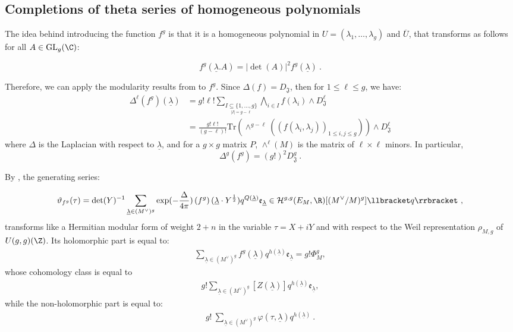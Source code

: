 \documentclass[11pt,letterpaper,english]{amsart}
\numberwithin{equation}{subsection}
\numberwithin{equation}{section}
\newcommand\cH{{\mathcal H}}
\newcommand\fJ{{\mathfrak J}}
\newcommand{\trace}{\mathrm{Tr}}
\theoremstyle{plain}
\theoremstyle{remark}
\begin{document}
\subsection{Completions of theta series of homogeneous polynomials}


The idea behind introducing the function $f^g$ is that it is a homogeneous polynomial in $U=(\lambda_1,\ldots,\lambda_g)$ and $\overline U$, that transforms as follows for all $A\in\mathrm{GL}_g(\C)$: 

\[f^g(\underline \lambda .A)=|\det(A)|^2f^g(\underline \lambda) ~.\] 

Therefore, we can apply the modularity results from  to $f^g$. Since $\Delta(f)=D_\fJ$, then for $1\leq \ell\leq g$, we have: 
\begin{align*}
    \Delta^\ell(f^g)(\underline{\lambda})&=g!\ell!\sum_{\underset{|I|=g-\ell}{I\subseteq\{1,\ldots,g\}} }\bigwedge_{i\in I}f(\lambda_i)\wedge D_{\fJ}^\ell\\
    &=\frac{g!\ell!}{(g-\ell)!}\trace\left(\wedge^{g-\ell}((f(\lambda_i,\lambda_j))_{1\leq i,j\leq g})\right)\wedge D_{\fJ}^\ell
\end{align*}
where $\Delta$ is the Laplacian with respect to $\underline{\lambda}$, and for a $g\times g$ matrix $P$, $\wedge^{\ell}(M)$ is the matrix of $\ell\times \ell$ minors. In particular, \[\Delta^g(f^g)=(g!)^2D_{\fJ}^g~.\] 


By , the generating series:

 \[\vartheta_{f^g}(\tau)=\det(Y)^{-1}\sum_{\underline{\lambda}\in (M^\vee)^g }\exp(-\frac{\Delta}{4\pi})\left(f^g\right)(\underline{\lambda}\cdot Y^{\frac{1}{2}})q^{Q(\underline{\lambda})}\mathfrak e_{\underline{\lambda}}\in \cH^{g,g}(E_M,\R)[(M^\vee/M)^g]\llbracket q \rrbracket~,\]
transforms like a Hermitian modular form of weight $2+n$ in the variable $\tau=X+iY$ and with respect to the Weil representation $\rho_{M,g}$ of $U(g,g)(\Z)$. Its holomorphic part is equal to: 
\begin{align*}
    \sum_{\underline{\lambda}\in (M^\vee)^g}f^g(\underline{\lambda})q^{h(\underline{\lambda})}\mathfrak e_{\underline \lambda}=g!\Phi^g_M,
\end{align*} 
whose cohomology class is equal to 
\begin{align*}
    g!\sum_{\underline{\lambda}\in (M^\vee)^g}[Z(\underline{\lambda})]q^{h(\underline{\lambda})}\mathfrak e_{\underline \lambda},
\end{align*} 
while the non-holomorphic part is equal to:
\begin{align*}
 g!~\sum_{\underline{\lambda}\in (M^{\vee})^g}\varphi(\tau, \underline{\lambda}) q^{h(\underline{\lambda})}~. 
\end{align*}
\end{document}
